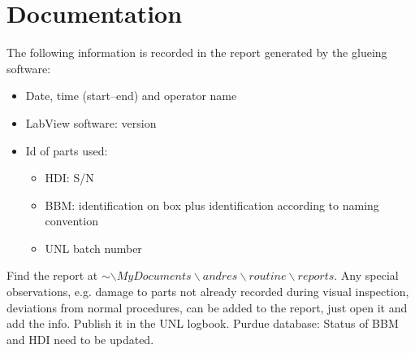 \documentclass[12pt]{unlsilabsop}
\begin{document}
\section{Documentation}
The following information is recorded in the report generated by the glueing software:
\begin{itemize}
    \item Date, time (start--end) and operator name
    \item LabView software: version
    \item Id of parts used:
	\begin{itemize}
	    \item HDI: S/N
	    \item BBM: identification on box plus identification according to naming convention
	    \item UNL batch number
	\end{itemize}
\end{itemize}

Find the report at $\sim\backslash MyDocuments\backslash andres\backslash routine\backslash reports$. Any special observations, e.g. damage to parts not already recorded during visual inspection, deviations from normal procedures, can be added to the report, just open it  and add the info. Publish it in the UNL logbook. 
Purdue database: Status of BBM and HDI need to be updated.
\end{document}
